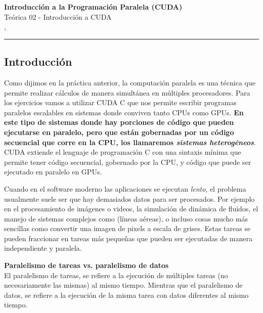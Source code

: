 



\begin{center}
  \LARGE\textbf{Introducción a la Programación Paralela (CUDA)} \\
  \Large{Teórica 02 - Introducción a CUDA} \\
  \normalsize{\currentsemester, \currentyear} \\
  \vspace{1em}
  \hrule
\end{center}

\setcounter{section}{2}

\subsection{Introducción}

Como dijimos en la práctica anterior, la computación paralela es una técnica que permite realizar cálculos de manera
simultánea en múltiples procesadores. Para los ejercicios vamos a utilizar CUDA C que nos permite escribir programas
paralelos escalables en sistemas donde conviven tanto CPUs como GPUs. \textbf{En este tipo de sistemas donde hay
porciones de código que pueden ejecutarse en paralelo, pero que están gobernadas por un código secuencial que corre en
la CPU, los llamaremos \textit{sistemas heterogéneos}}. CUDA extiende el lenguaje de programación C con una sintaxis
mínima que permite tener código secuencial, gobernado por la CPU, y código que puede ser ejecutado en paralelo en GPUs.

Cuando en el software moderno las aplicaciones se ejecutan \textit{lento}, el problema usualmente suele ser que hay
demasiados datos para ser procesados. Por ejemplo en el procesamiento de imágenes o videos, la simulación de dinámica de
fluidos, el manejo de sistemas complejos como (líneas aéreas), o incluso cosas mucho más sencillas como convertir una
imagen de pixels a escala de grises. Estas tareas se pueden fraccionar en tareas más pequeñas que pueden ser ejecutadas
de manera independiente y paralela.

\begin{tcolorbox}[colback=mint,colframe=mint!75!black,arc=0pt,outer arc=0pt]
  \textbf{Paralelismo de tareas vs. paralelismo de datos} \\

  El paralelismo de tareas, se refiere a la ejecución de múltiples tareas (no necesariamente las mismas) al mismo tiempo.
  Mientras que el paralelismo de datos, se refiere a la ejecución de la misma tarea con datos diferentes al mismo tiempo.
\end{tcolorbox}

